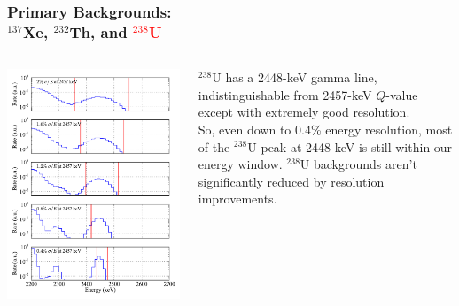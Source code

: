\documentclass{beamer}
\begin{document}
\begin{frame}
\begin{center}
\frametitle{\hfill Primary Backgrounds:\\\hfill $^{137}$Xe, $^{232}$Th, and \textcolor{red}{$^{238}$U}}
\end{center}
\begin{columns}
\begin{column}{.6\textwidth}
\includegraphics[keepaspectratio=true,width=\textwidth]{U_Spectra_vs_Res.pdf}
\end{column}
\begin{column}{.4\textwidth}
\vspace{0.5cm}

$^{238}$U has a 2448-keV gamma line, indistinguishable from 2457-keV $Q$-value except with extremely good resolution.\\[\baselineskip]

So, even down to 0.4\% energy resolution, most of the $^{238}$U peak at 2448 keV is still within our energy window.  $^{238}$U backgrounds aren't significantly reduced by resolution improvements.
\end{column}
\end{columns}
\end{frame}
\end{document}
